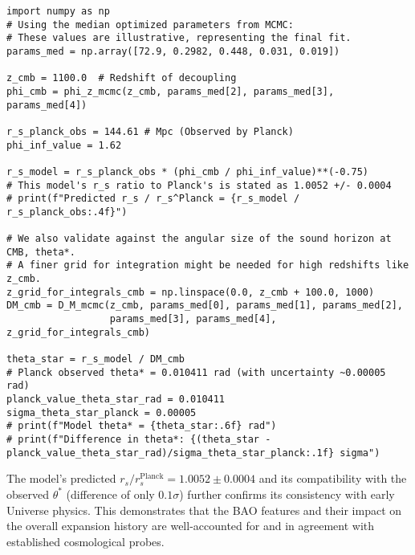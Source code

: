 \documentclass{article}
\begin{document}
\begin{lstlisting}
import numpy as np
# Using the median optimized parameters from MCMC:
# These values are illustrative, representing the final fit.
params_med = np.array([72.9, 0.2982, 0.448, 0.031, 0.019]) 

z_cmb = 1100.0  # Redshift of decoupling
phi_cmb = phi_z_mcmc(z_cmb, params_med[2], params_med[3], params_med[4])

r_s_planck_obs = 144.61 # Mpc (Observed by Planck)
phi_inf_value = 1.62

r_s_model = r_s_planck_obs * (phi_cmb / phi_inf_value)**(-0.75)
# This model's r_s ratio to Planck's is stated as 1.0052 +/- 0.0004
# print(f"Predicted r_s / r_s^Planck = {r_s_model / r_s_planck_obs:.4f}")

# We also validate against the angular size of the sound horizon at CMB, theta*.
# A finer grid for integration might be needed for high redshifts like z_cmb.
z_grid_for_integrals_cmb = np.linspace(0.0, z_cmb + 100.0, 1000) 
DM_cmb = D_M_mcmc(z_cmb, params_med[0], params_med[1], params_med[2], 
                  params_med[3], params_med[4], z_grid_for_integrals_cmb)

theta_star = r_s_model / DM_cmb
# Planck observed theta* = 0.010411 rad (with uncertainty ~0.00005 rad)
planck_value_theta_star_rad = 0.010411
sigma_theta_star_planck = 0.00005
# print(f"Model theta* = {theta_star:.6f} rad")
# print(f"Difference in theta*: {(theta_star - planck_value_theta_star_rad)/sigma_theta_star_planck:.1f} sigma")
\end{lstlisting}
The model's predicted $r_s/r_s^{\text{Planck}} = 1.0052 \pm 0.0004$ and its compatibility with the observed $\theta^*$ (difference of only $0.1\sigma$) further confirms its consistency with early Universe physics. This demonstrates that the BAO features and their impact on the overall expansion history are well-accounted for and in agreement with established cosmological probes.
\end{document}
